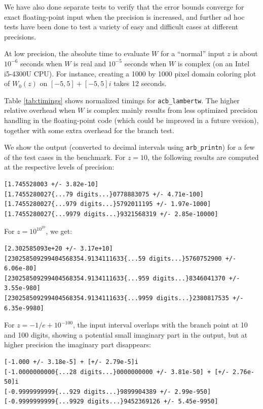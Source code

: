 \documentclass[11pt,a4paper]{article}
\begin{document}
We have also done separate tests
to verify that the error bounds converge for exact floating-point input
when the precision is increased,
and further ad hoc tests have been done 
to test a variety of easy and difficult cases at different precisions.

At low precision, the absolute time to evaluate $W$ for
a ``normal'' input $z$ is about $10^{-6}$ seconds when $W$ is real
and $10^{-5}$ seconds when $W$ is complex (on an Intel i5-4300U CPU).
For instance, creating a 1000 by 1000 pixel domain coloring
plot of $W_0(z)$ on $[-5,5] + [-5,5]i$ takes 12 seconds.

Table \ref{tab:timings} shows normalized timings for \texttt{acb\_lambertw}.
The higher relative overhead when $W$ is complex 
mainly results from less optimized precision handling in the
floating-point code (which could be improved in a future version),
together with some extra overhead for the branch test.

We show the output (converted to decimal intervals using \texttt{arb\_printn})
for a few of the test cases in the benchmark.
For $z = 10$, the following results are computed at
the respective levels of precision:
\begin{small}
\begin{verbatim}
[1.745528003 +/- 3.82e-10]
[1.7455280027{...79 digits...}0778883075 +/- 4.71e-100]
[1.7455280027{...979 digits...}5792011195 +/- 1.97e-1000]
[1.7455280027{...9979 digits...}9321568319 +/- 2.85e-10000]
\end{verbatim}
\end{small}

For $z = 10^{10^{20}}$, we get:
\begin{small}
\begin{verbatim}
[2.302585093e+20 +/- 3.17e+10]
[230258509299404568354.9134111633{...59 digits...}5760752900 +/- 6.06e-80]
[230258509299404568354.9134111633{...959 digits...}8346041370 +/- 3.55e-980]
[230258509299404568354.9134111633{...9959 digits...}2380817535 +/- 6.35e-9980]
\end{verbatim}
\end{small}

For $z = -1/e+10^{-100}$, the input interval overlaps with the branch
point at 10 and 100 digits, showing a potential small imaginary part in the output,
but at higher precision the imaginary part disappears:
\begin{small}
\begin{verbatim}
[-1.000 +/- 3.18e-5] + [+/- 2.79e-5]i
[-1.0000000000{...28 digits...}0000000000 +/- 3.81e-50] + [+/- 2.76e-50]i
[-0.9999999999{...929 digits...}9899904389 +/- 2.99e-950]
[-0.9999999999{...9929 digits...}9452369126 +/- 5.45e-9950]
\end{verbatim}
\end{small}
\end{document}
